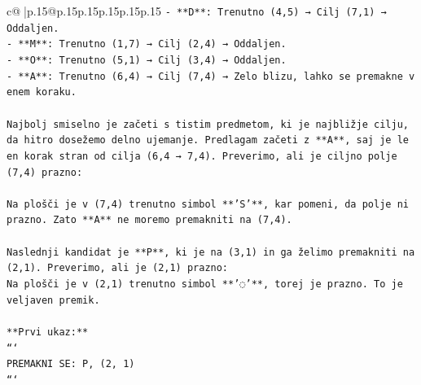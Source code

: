 \documentclass{article}
\begin{document}
{\begin{supertabular}{c@{$\;$}|p{.15\linewidth}@{}p{.15\linewidth}p{.15\linewidth}p{.15\linewidth}p{.15\linewidth}p{.15\linewidth}}
{{{\texttt{{-} **D**: Trenutno (4,5) → Cilj (7,1) → Oddaljen.} \\
\texttt{{-} **M**: Trenutno (1,7) → Cilj (2,4) → Oddaljen.} \\
\texttt{{-} **O**: Trenutno (5,1) → Cilj (3,4) → Oddaljen.} \\
\texttt{{-} **A**: Trenutno (6,4) → Cilj (7,4) → Zelo blizu, lahko se premakne v enem koraku.} \\
\\ 
\texttt{Najbolj smiselno je začeti s tistim predmetom, ki je najbližje cilju, da hitro dosežemo delno ujemanje. Predlagam začeti z **A**, saj je le en korak stran od cilja (6,4 → 7,4). Preverimo, ali je ciljno polje (7,4) prazno:} \\
\\ 
\texttt{Na plošči je v (7,4) trenutno simbol **'S'**, kar pomeni, da polje ni prazno. Zato **A** ne moremo premakniti na (7,4).} \\
\\ 
\texttt{Naslednji kandidat je **P**, ki je na (3,1) in ga želimo premakniti na (2,1). Preverimo, ali je (2,1) prazno:} \\
\texttt{Na plošči je v (2,1) trenutno simbol **'◌'**, torej je prazno. To je veljaven premik.} \\
\\ 
\texttt{**Prvi ukaz:**} \\
\texttt{```} \\
\texttt{PREMAKNI SE: P, (2, 1)} \\
\texttt{```} \\
            }
        }
    }
     \\ \\


\end{supertabular}}
\end{document}
